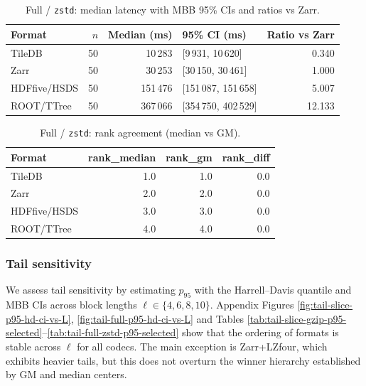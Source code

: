 \documentclass[nomenclature, english, bibtex]{kththesis}
\numberwithin{listing}{chapter}
\begin{document}
\begin{table}[H]
  \centering
  \caption{Full / \texttt{zstd}: median latency with \gls{MBB} 95\% CIs and ratios vs Zarr.}
  \label{tab:np_full_zstd_median}
  \begin{tabular}{l r r l r}
    \toprule
    Format & $n$ & Median (ms) & 95\% \gls{CI} (ms) & Ratio vs Zarr \\
    \midrule
    TileDB & 50 & 10\,283 & [9\,931, 10\,620] & 0.340 \\
    Zarr   & 50 & 30\,253 & [30\,150, 30\,461] & 1.000 \\
    \gls{HDFfive}/\gls{HSDS}   & 50 & 151\,476 & [151\,087, 151\,658] & 5.007 \\
    \gls{ROOT}/\gls{TTree}   & 50 & 367\,066 & [354\,750, 402\,529] & 12.133 \\
    \bottomrule
  \end{tabular}
\end{table}

\begin{table}[H]
  \centering
  \caption{Full / \texttt{zstd}: rank agreement (median vs \gls{GM}).}
  \label{tab:np_full_zstd_rank}
  \begin{tabular}{l r r r}
    \toprule
    Format & rank\_median & rank\_gm & rank\_diff \\
    \midrule
    TileDB & 1.0 & 1.0 & 0.0 \\
    Zarr   & 2.0 & 2.0 & 0.0 \\
    \gls{HDFfive}/\gls{HSDS}   & 3.0 & 3.0 & 0.0 \\
    \gls{ROOT}/\gls{TTree}   & 4.0 & 4.0 & 0.0 \\
    \bottomrule
  \end{tabular}
\end{table}


\subsubsection{Tail sensitivity}
We assess tail sensitivity by estimating $p_{95}$ with the Harrell–Davis quantile and \gls{MBB} CIs across block lengths $\ell\in\{4,6,8,10\}$. Appendix Figures \ref{fig:tail-slice-p95-hd-ci-vs-L}, \ref{fig:tail-full-p95-hd-ci-vs-L} and Tables \ref{tab:tail-slice-gzip-p95-selected}–\ref{tab:tail-full-zstd-p95-selected} show that the ordering of formats is stable across $\ell$ for all codecs. The main exception is Zarr+\gls{LZfour}, which exhibits heavier tails, but this does not overturn the winner hierarchy established by \gls{GM} and median centers.
\end{document}
